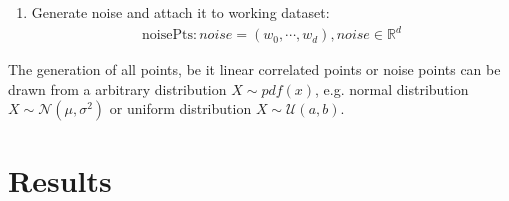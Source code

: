 \begin{enumerate}[resume]
\item Generate noise and attach it to working dataset:
\begin{align}
    \text{noisePts}: noise = (w_0, \cdots, w_d), noise \in \mathbb{R}^{d}
\end{align}
\end{enumerate}

The generation of all points, be it linear correlated points or noise points can be drawn from a arbitrary distribution $X \sim pdf(x)$, e.g. normal distribution $X \sim \mathcal{N}(\mu,\sigma^2)$ or uniform distribution $X \sim \mathcal{U}(a,b)$.

\chapter{Results}